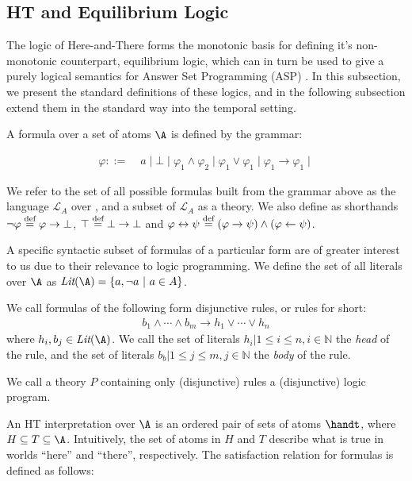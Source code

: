 \subsection{HT and Equilibrium Logic}

The logic of Here-and-There forms the monotonic basis for defining
it's non-monotonic counterpart, equilibrium logic, which can in turn
be used to give a purely logical semantics for Answer Set Programming
(ASP) \cite{pearce06a}. In this subsection, we present the standard
definitions of these logics, and in the following subsection extend
them in the standard way into the temporal setting.

A formula over a set of atoms $\A$ is defined by the grammar:

\begin{align*}
    \varphi ::= &\; a \mid \bot \mid
                  \varphi_1 \wedge \varphi_2 \mid
                  \varphi_1 \vee \varphi_1 \mid
                  \varphi_1 \to \varphi_1 \mid
\end{align*}

We refer to the set of all possible formulas built from the grammar above as the language $\mathcal{L}_A$ over \A, and a subset of $\mathcal{L}_A$ as a theory.
We also define as shorthands $\neg \varphi \stackrel{\text{def}}{=} \varphi \to \bot$, 
$\top \stackrel{\text{def}}{=} \bot \to \bot$ and $\varphi \leftrightarrow \psi \stackrel{\text{def}}{=} (\varphi \rightarrow \psi) \wedge (\varphi \leftarrow \psi)$.

A specific syntactic subset of formulas of a particular form are of
greater interest to us due to their relevance to logic programming.
We define the set of all literals over $\A$ as
$\textit{Lit}(\A) = \{ a, \lnot a\ |\ a \in A \}$.

\begin{definition}
    We call formulas of the following form disjunctive rules, or rules for short:
\begin{align*}
  b_{1} \wedge \cdots \wedge b_{m} \rightarrow h_1 \vee \cdots \vee h_{n}
\end{align*}
where $h_{i}, b_{j} \in \textit{Lit}(\A)$. We call the set of literals ${ h_i | 1 \leq i \leq n, i\in \mathbb{N}}$ the \emph{head} of the rule, and the set of literals ${ b_b | 1 \leq j \leq m, j \in \mathbb{N}}$ the \emph{body} of the rule.
\end{definition}

We call a theory $P$ containing only (disjunctive) rules a
(disjunctive) logic program.

An HT interpretation over $\A$ is an ordered pair of sets of atoms
$\handt$, where $H \subseteq T \subseteq \A$. Intuitively, the set of
atoms in $H$ and $T$ describe what is true in worlds ``here'' and
``there'', respectively. The satisfaction relation for formulas is
defined as follows:

